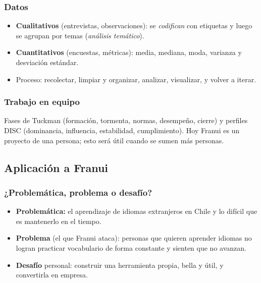 \subsubsection{Datos}
\begin{itemize}
  \item \textbf{Cualitativos} (entrevistas, observaciones): se \emph{codifican} con etiquetas y luego
        se agrupan por temas (\emph{análisis temático}).
  \item \textbf{Cuantitativos} (encuestas, métricas): media, mediana, moda, varianza y desviación estándar.
  \item Proceso: recolectar, limpiar y organizar, analizar, visualizar, y volver a iterar.
\end{itemize}

\subsubsection{Trabajo en equipo}
Fases de Tuckman (formación, tormenta, normas, desempeño, cierre) y perfiles DISC (dominancia,
influencia, estabilidad, cumplimiento). Hoy Franui es un proyecto de una persona; esto será útil
cuando se sumen más personas.

\subsection{Aplicación a Franui}

\subsubsection{¿Problemática, problema o desafío?}
\begin{itemize}
  \item \textbf{Problemática:} el aprendizaje de idiomas extranjeros en Chile y lo difícil que es mantenerlo en el tiempo.
  \item \textbf{Problema} (el que Franui ataca): personas que quieren aprender idiomas no logran practicar
        vocabulario de forma constante y sienten que no avanzan.
  \item \textbf{Desafío} personal: construir una herramienta propia, bella y útil, y convertirla en empresa.
\end{itemize}

